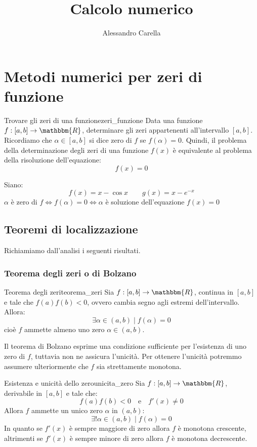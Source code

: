 \documentclass[12pt]{report}
\date{}
\author{Alessandro Carella}
\title{Calcolo numerico}
\newcounter{theorem}
\newcommand{\nmu}{}
\begin{document}
	{
		\let\cleardoublepage\clearpage
		\maketitle
		\tableofcontents
	}
\chapter{Metodi numerici per zeri di funzione}
\begin{assignment}{\nmu Trovare gli zeri di una funzione}{zeri_funzione}
	Data una funzione $f: [a, b] \to \mathbbm{R}$, determinare gli zeri appartenenti all'intervallo $[a, b]$. \\
	Ricordiamo che $\alpha \in [a, b]$ si dice zero di $f$ se $f(\alpha) = 0$. Quindi, il problema della determinazione degli zeri di una funzione $f(x)$ è equivalente al problema della risoluzione dell'equazione:
	\[
	f(x) = 0
	\]
\end{assignment}
\begin{example}{}{}
	Siano:
	\[
	f(x) = x - \cos x \quad \quad g(x) = x - e^{-x}
	\]
	$\alpha$ è zero di $f \iff f(\alpha) = 0 \iff \alpha$ è soluzione dell'equazione $f(x) = 0$
\end{example}
\section{Teoremi di localizzazione}
Richiamiamo dall'analisi i seguenti risultati.
\subsection{Teorema degli zeri o di Bolzano}
\begin{theorem}{\nmu Teorema degli zeri}{teorema_zeri}
	Sia $f: [a, b] \to \mathbbm{R}$, continua in $[a,b]$ e tale che $f(a)f(b) < 0$, ovvero cambia segno agli estremi dell'intervallo. \\
	Allora:
	\[
	\exists \alpha \in (a, b) \mid f(\alpha) = 0
	\]
	cioè $f$ ammette almeno uno zero $\alpha \in (a, b)$.
\end{theorem}
Il teorema di Bolzano esprime una condizione sufficiente per l'esistenza di uno zero di $f$, tuttavia non ne assicura l'unicità. Per ottenere l'unicità potremmo assumere ulteriormente che $f$ sia strettamente monotona.
\begin{theorem}{\nmu Esistenza e unicità dello zero}{unicita_zero}
	Sia $f: [a, b] \to \mathbbm{R}$, derivabile in $[a, b]$ e tale che:
	\[
	f(a)f(b) < 0 \quad \text{e} \quad f'(x) \neq 0
	\]
	Allora $f$ ammette un unico zero $\alpha$ in $(a, b)$:
	\[
	\exists ! \alpha \in (a, b) \mid f(\alpha) = 0
	\]
	In quanto se $f'(x)$ è sempre maggiore di zero allora $f$ è monotona crescente, altrimenti se $f'(x)$ è sempre minore di zero allora $f$ è monotona decrescente.
\end{theorem}
\end{document}

